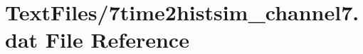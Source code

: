\hypertarget{7time2histsim__channel7_8dat}{}\section{Text\+Files/7time2histsim\+\_\+channel7.dat File Reference}
\label{7time2histsim__channel7_8dat}
